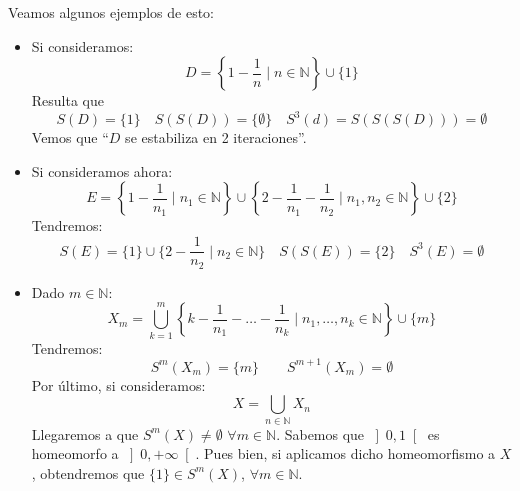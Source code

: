 \begin{ejemplo}
    Veamos algunos ejemplos de esto:
    \begin{itemize}
        \item Si consideramos:
            \begin{equation*}
                D = \left\{1 - \frac{1}{n} \mid n\in \mathbb{N}\right\} \cup \{1\}
            \end{equation*}
            Resulta que
            \begin{equation*}
                S(D) = \{1\} \quad S(S(D)) = \{\emptyset \} \quad S^3(d) = S(S(S(D))) = \emptyset 
            \end{equation*}
            Vemos que ``$D$ se estabiliza en 2 iteraciones''.
        \item Si consideramos ahora:
            \begin{equation*}
                E = \left\{1 - \frac{1}{n_1}\mid n_1\in \mathbb{N}\right\} \cup \left\{2 - \frac{1}{n_1} - \frac{1}{n_2} \mid n_1,n_2\in \mathbb{N}\right\} \cup \{2\}
            \end{equation*}
            Tendremos:
            \begin{equation*}
                S(E) = \{1\} \cup \{2 - \frac{1}{n_2}\mid n_2 \in \mathbb{N}\} \quad 
                S(S(E)) = \{2\} \quad 
                S^3(E) = \emptyset 
            \end{equation*}
        \item Dado $m\in \mathbb{N}$:
            \begin{equation*}
                X_m = \bigcup_{k=1}^m \left\{k - \frac{1}{n_1}- \ldots - \frac{1}{n_k} \mid n_1,\ldots, n_k \in \mathbb{N}\right\} \cup \{m\}
            \end{equation*}
            Tendremos:
            \begin{equation*}
                S^m(X_m) = \{m\} \qquad S^{m+1}(X_m) = \emptyset 
            \end{equation*}
            Por último, si consideramos:
            \begin{equation*}
                X = \bigcup_{n\in \mathbb{N}} X_n
            \end{equation*}
            Llegaremos a que $S^m(X) \neq \emptyset $  $\forall m\in \mathbb{N}$. Sabemos que $\left]0,1\right[$ es homeomorfo a $\left]0,+\infty\right[$. Pues bien, si aplicamos dicho homeomorfismo a $X$, obtendremos que $\{1\} \in S^m(X)$, $\forall m\in \mathbb{N}$.
    \end{itemize}
\end{ejemplo}

